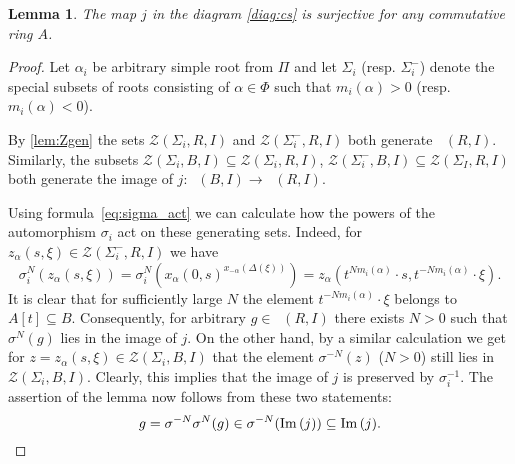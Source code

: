 \documentclass[oneside,12pt]{amsart}
\numberwithin{equation}{section}
\newtheorem{lem}{Lemma}
\numberwithin{lem}{section}
\theoremstyle{definition}
\theoremstyle{remark}
\DeclareMathOperator{\St}{St^G}
\DeclareMathOperator{\im}{Im\,}
\begin{document}
\begin{lem} The map $j$ in the diagram \eqref{diag:cs} is surjective for any commutative ring $A$. \end{lem}
\begin{proof}
 Let $\alpha_i$ be arbitrary simple root from $\Pi$ and let $\Sigma_i$ (resp. $\Sigma_i^-$) denote the special subsets of roots 
 consisting of $\alpha \in \Phi$ such that $m_i(\alpha) > 0$ (resp. $m_i(\alpha) < 0$).
 
 By \cref{lem:Zgen} the sets $\mathcal{Z}(\Sigma_i, R, I)$ and $\mathcal{Z}(\Sigma_i^-, R, I)$ both generate $\St(R, I)$.
 Similarly, the subsets $\mathcal{Z}(\Sigma_i, B, I) \subseteq \mathcal{Z}(\Sigma_i, R, I)$,
                        $\mathcal{Z}(\Sigma_i^-, B, I) \subseteq \mathcal{Z}(\Sigma_I, R, I)$ both generate 
                        the image of $j\colon \St(B, I) \to \St(R, I)$.

 Using formula~\eqref{eq:sigma_act} we can calculate how the powers of the automorphism $\sigma_i$ act on these generating sets.
 Indeed, for $z_\alpha(s, \xi) \in \mathcal{Z}(\Sigma_i^-, R, I)$ we have
 \[ \sigma_i^N (z_\alpha(s, \xi)) = \sigma_i^N (x_\alpha(0, s)^{x_{-\alpha}(\Delta(\xi))}) = 
     z_\alpha(t^{N m_i(\alpha)} \cdot s, t^{-N m_i(\alpha)} \cdot \xi). \]
 It is clear that for sufficiently large $N$ the element $t^{-N m_i(\alpha)} \cdot \xi$ belongs to $A[t] \subseteq B$.
 Consequently, for arbitrary $g \in \St(R, I)$ there exists $N > 0$ such that $\sigma^N(g)$ lies in the image of $j$.
 On the other hand, by a similar calculation we get for $z=z_{\alpha}(s, \xi) \in \mathcal{Z}(\Sigma_i, B, I)$ 
 that the element $\sigma^{-N}(z)$ ($N > 0$) still lies in $\mathcal{Z}(\Sigma_i, B, I)$.
 Clearly, this implies that the image of $j$ is preserved by $\sigma_i^{-1}$.
 The assertion of the lemma now follows from these two statements:
 \[ g = \sigma^{-N} \sigma^N (g) \in \sigma^{-N}(\im(j)) \subseteq \im(j). \qedhere\] \end{proof}
\end{document}
